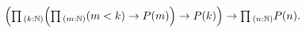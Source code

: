 \begin{exercises}
\begin{subexenum}
    \begin{equation*}
      \Big(\prd{k:\N} \Big(\prd{m:\N} (m< k) \to P(m)\Big)\to P(k)\Big) \to \prd{n:\N}P(n).
    \end{equation*}
  \end{subexenum}
\begin{comment}
\item
  \begin{subexenum}
  \item For each $i:\Fin(\succN(n))$, define a function
    \begin{equation*}
      \skipFin_i : \Fin(n)\to\Fin(\succN(n))
    \end{equation*}
    that includes $\Fin(n)$ in $\Fin(\succN(n))$ by skipping $i$.
  \item For each $i:\Fin(n)$, define a function
    \begin{equation*}
      \doubleFin_i : \Fin(\succN(n))\to\Fin(n)
    \end{equation*}
    that projects $\Fin(\succN(n))$ onto $\Fin(n)$ by doubling at $i$. 
  \end{subexenum}
\end{comment}
\end{exercises}

